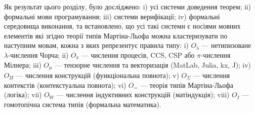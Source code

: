 Як результат цього розділу, було досліджено:
i) усі системи доведення теорем;
ii) формальні мови програмування;
iii) системи верифікації;
iv) формальні середовища виконання,
та встановлено, що усі такі системи є носіями
мовних елементів які згідно теорії типів Мартіна-Льофа можна
кластеризувати по наступним мовам, кожна з яких репрезентує правила типу:
i) $O_\lambda$ --- нетипизоване $\lambda$-числення Чорча;
ii) $O_\pi$ --- числення процесів, CCS, CSP або $\pi$-числення Мілнера;
iii) $O_\mu$ --- тензорне числення та векторизація (MatLab, Julia, kx, J);
iv) $O_\Pi$ --- числення конструкцій (функціональна повнота);
v) $O_\Sigma$ --- числення контекстів (контекстуальна повнота);
vi) $O_=$ --- теорія типів Мартіна-Льофа (логіка);
vii) $O_W$ --- числення індуктивних конструкцій (матіндукція);
viii) $O_I$ --- гомотопічна система типів (формальна математика).
